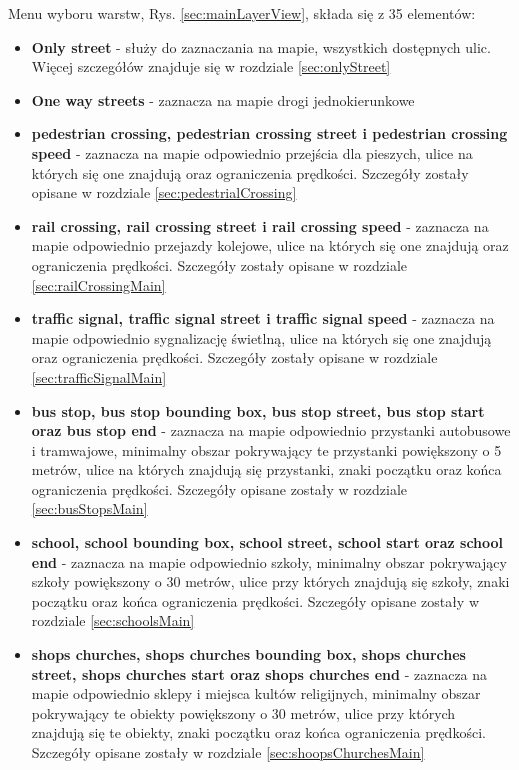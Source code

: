 Menu wyboru warstw, Rys. \ref{sec:mainLayerView}, składa się z 35 elementów:
\begin{itemize}
\item \textbf{Only street} - służy do zaznaczania na mapie, wszystkich dostępnych ulic. Więcej szczegółów znajduje się w rozdziale \ref{sec:onlyStreet}
\item \textbf{One way streets} - zaznacza na mapie drogi jednokierunkowe
\item \textbf{pedestrian crossing, pedestrian crossing street i pedestrian crossing speed} - zaznacza na mapie odpowiednio przejścia dla pieszych, ulice na których się one znajdują oraz ograniczenia prędkości. Szczegóły zostały opisane w rozdziale \ref{sec:pedestrialCrossing} 
\item \textbf{rail crossing, rail crossing street i rail crossing speed} - zaznacza na mapie odpowiednio przejazdy kolejowe, ulice na których się one znajdują oraz ograniczenia prędkości. Szczegóły zostały opisane w rozdziale \ref{sec:railCrossingMain} 
\item \textbf{traffic signal, traffic signal street i traffic signal speed} - zaznacza na mapie odpowiednio sygnalizację świetlną, ulice na których się one znajdują oraz ograniczenia prędkości. Szczegóły zostały opisane w rozdziale \ref{sec:trafficSignalMain} 
\item \textbf{bus stop, bus stop bounding box, bus stop street, bus stop start oraz bus stop end} - zaznacza na mapie odpowiednio przystanki autobusowe i tramwajowe, minimalny obszar pokrywający te przystanki powiększony o 5 metrów, ulice na których znajdują się przystanki, znaki początku oraz końca ograniczenia prędkości. Szczegóły opisane zostały w rozdziale \ref{sec:busStopsMain}
\item \textbf{school, school bounding box, school street, school start oraz school end} - zaznacza na mapie odpowiednio szkoły, minimalny obszar pokrywający szkoły powiększony o 30 metrów, ulice przy których znajdują się szkoły, znaki początku oraz końca ograniczenia prędkości. Szczegóły opisane zostały w rozdziale \ref{sec:schoolsMain}
\item \textbf{shops churches, shops churches bounding box, shops churches street, shops churches start oraz shops churches end} - zaznacza na mapie odpowiednio sklepy i miejsca kultów religijnych, minimalny obszar pokrywający te obiekty powiększony o 30 metrów, ulice przy których znajdują się te obiekty, znaki początku oraz końca ograniczenia prędkości. Szczegóły opisane zostały w rozdziale \ref{sec:shoopsChurchesMain}

\end{itemize}
